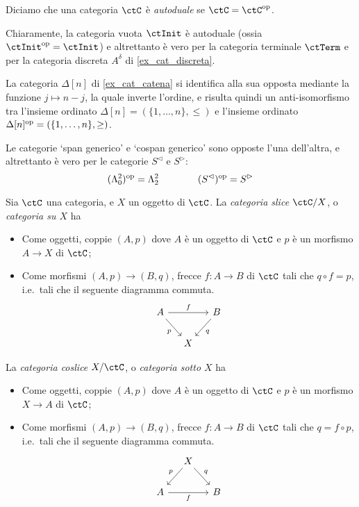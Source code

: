 \begin{remark}
	Diciamo che una categoria \(\ctC\) è \emph{autoduale} se \(\ctC=\ctC^\op\).

	Chiaramente, la categoria vuota \(\ctInit\) è autoduale (ossia \(\ctInit^\op=\ctInit\)) e altrettanto è vero per la categoria terminale \(\ctTerm\) e per la categoria discreta \(A^\delta\) di \ref{ex_cat_discreta}.

	La categoria \(\Delta[n]\) di \ref{ex_cat_catena} si identifica alla sua opposta mediante la funzione \(j\mapsto n-j\), la quale inverte l'ordine, e risulta quindi un anti-isomorfismo tra l'insieme ordinato \(\Delta[n]=(\{1,\dots,n\},\le)\) e l'insieme ordinato \(\Delta[n]^{\text{op}} = (\{1,\dots,n\},\ge)\).

	Le categorie `span generico' e `cospan generico' sono opposte l'una dell'altra, e altrettanto è vero per le categorie \(S^\lhd\) e \(S^\rhd\):
	\[(\Lambda^2_0)^{\text{op}} = \Lambda^2_2\qquad\qquad (S^\lhd)^{\text{op}} = S^\rhd\]
\end{remark}

\begin{definition}\label{def_cat_slice}
	Sia \(\ctC\) una categoria, e \(X\) un oggetto di \(\ctC\). 
	La \emph{categoria slice} \(\ctC/X\), o \emph{categoria su \(X\)} ha 
	\begin{itemize}
		\item Come oggetti, coppie \((A,p)\) dove \(A\) è un oggetto di \(\ctC\) e \(p\) è un morfismo \(A\to X\) di \(\ctC\);
		\item Come morfismi \((A,p)\to(B,q)\), frecce \(f:A\to B\) di \(\ctC\) tali che \(q\circ f=p\), i.e.\ tali che il seguente diagramma commuta.
		\[
		\begin{tikzcd}[column sep=small]
			A \ar{rr}{f} \ar{dr}[swap]{p} && B \ar{dl}{q} \\
			& X
		\end{tikzcd}
		\]
	\end{itemize}

	La \emph{categoria coslice} \(X/\ctC\), o \emph{categoria sotto \(X\)} ha 
	\begin{itemize}
		\item Come oggetti, coppie \((A,p)\) dove \(A\) è un oggetto di \(\ctC\) e \(p\) è un morfismo \(X\to A\) di \(\ctC\);
		\item Come morfismi \((A,p)\to(B,q)\), frecce \(f:A\to B\) di \(\ctC\) tali che \(q=f\circ p\), i.e.\ tali che il seguente diagramma commuta.
		\[
		\begin{tikzcd}[column sep=small]
			& X \ar{dl}[swap]{p} \ar{dr}{q}  \\
			A \ar{rr}[swap]{f} && B 
		\end{tikzcd}
		\]
	\end{itemize}
\end{definition}

